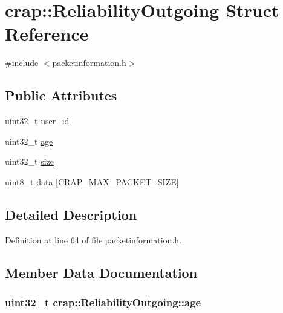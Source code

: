 \hypertarget{structcrap_1_1_reliability_outgoing}{}\section{crap\+:\+:Reliability\+Outgoing Struct Reference}
\label{structcrap_1_1_reliability_outgoing}


{\ttfamily \#include $<$packetinformation.\+h$>$}

\subsection*{Public Attributes}
\begin{DoxyCompactItemize}
\item 
uint32\+\_\+t \hyperlink{structcrap_1_1_reliability_outgoing_ab8d8d70315c7997f72bd8472c6ba1344}{user\+\_\+id}
\item 
uint32\+\_\+t \hyperlink{structcrap_1_1_reliability_outgoing_a2b27b75e5751a41c2047022627596c8e}{age}
\item 
uint32\+\_\+t \hyperlink{structcrap_1_1_reliability_outgoing_ac495bd52515b57b0b2186c8c15f4aed4}{size}
\item 
uint8\+\_\+t \hyperlink{structcrap_1_1_reliability_outgoing_a92f6942dcf7225db1c922dd43fae677e}{data} \mbox{[}\hyperlink{packetinformation_8h_a0811d6d7f9c275bf8f3af82d61a31e0f}{C\+R\+A\+P\+\_\+\+M\+A\+X\+\_\+\+P\+A\+C\+K\+E\+T\+\_\+\+S\+I\+Z\+E}\mbox{]}
\end{DoxyCompactItemize}


\subsection{Detailed Description}


Definition at line 64 of file packetinformation.\+h.



\subsection{Member Data Documentation}
\hypertarget{structcrap_1_1_reliability_outgoing_a2b27b75e5751a41c2047022627596c8e}{}
\subsubsection[{age}]{\setlength{\rightskip}{0pt plus 5cm}uint32\+\_\+t crap\+::\+Reliability\+Outgoing\+::age}\label{structcrap_1_1_reliability_outgoing_a2b27b75e5751a41c2047022627596c8e}


